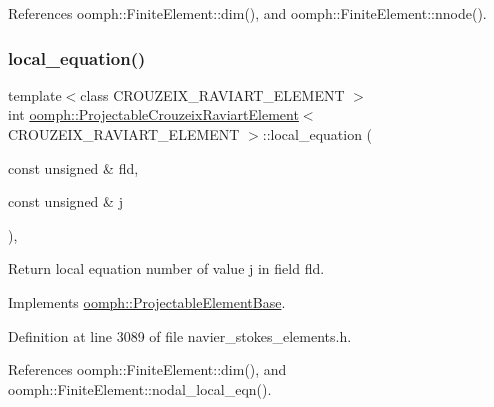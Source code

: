 References oomph\+::\+Finite\+Element\+::dim(), and oomph\+::\+Finite\+Element\+::nnode().

\mbox{\label{classoomph_1_1ProjectableCrouzeixRaviartElement_a1cea4dd9a75e28f84b1b7ab71a5c64eb}} 
\subsubsection{\texorpdfstring{local\+\_\+equation()}{local\_equation()}}
{\footnotesize\ttfamily template$<$class C\+R\+O\+U\+Z\+E\+I\+X\+\_\+\+R\+A\+V\+I\+A\+R\+T\+\_\+\+E\+L\+E\+M\+E\+NT $>$ \\
int \hyperlink{classoomph_1_1ProjectableCrouzeixRaviartElement}{oomph\+::\+Projectable\+Crouzeix\+Raviart\+Element}$<$ C\+R\+O\+U\+Z\+E\+I\+X\+\_\+\+R\+A\+V\+I\+A\+R\+T\+\_\+\+E\+L\+E\+M\+E\+NT $>$\+::local\+\_\+equation (\begin{DoxyParamCaption}\item[{const unsigned \&}]{fld,  }\item[{const unsigned \&}]{j }\end{DoxyParamCaption})\hspace{0.3cm}{\ttfamily [inline]}, {\ttfamily [virtual]}}



Return local equation number of value j in field fld. 



Implements \hyperlink{classoomph_1_1ProjectableElementBase_ac5c27ae929ff636dc7747fe23fd4f738}{oomph\+::\+Projectable\+Element\+Base}.



Definition at line 3089 of file navier\+\_\+stokes\+\_\+elements.\+h.



References oomph\+::\+Finite\+Element\+::dim(), and oomph\+::\+Finite\+Element\+::nodal\+\_\+local\+\_\+eqn().

\mbox{\label{classoomph_1_1ProjectableCrouzeixRaviartElement_a90aa4875deb63383d5e4bf7b4a860a3c}} 
